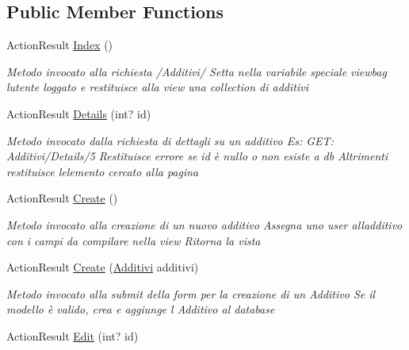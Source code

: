 \subsection*{Public Member Functions}
\begin{DoxyCompactItemize}
\item 
Action\+Result \mbox{\hyperlink{class_brew_day2_1_1_controllers_1_1_additivi_controller_abc59038a7b58a22f8300921d8c0fe72e}{Index}} ()
\begin{DoxyCompactList}\small\item\em Metodo invocato alla richiesta /\+Additivi/ Setta nella variabile speciale viewbag l\textquotesingle{}utente loggato e restituisce alla view una collection di additivi \end{DoxyCompactList}\item 
Action\+Result \mbox{\hyperlink{class_brew_day2_1_1_controllers_1_1_additivi_controller_a9fb0eab448c2b1bd33b3fdb2cd36ad55}{Details}} (int? id)
\begin{DoxyCompactList}\small\item\em Metodo invocato dalla richiesta di dettagli su un additivo Es\+: G\+ET\+: Additivi/\+Details/5 Restituisce errore se id è nullo o non esiste a db Altrimenti restituisce l\textquotesingle{}elemento cercato alla pagina \end{DoxyCompactList}\item 
Action\+Result \mbox{\hyperlink{class_brew_day2_1_1_controllers_1_1_additivi_controller_abe67a6f7b711dac3af4d6e1225867eb5}{Create}} ()
\begin{DoxyCompactList}\small\item\em Metodo invocato alla creazione di un nuovo additivo Assegna uno user all\textquotesingle{}additivo con i campi da compilare nella view Ritorna la vista \end{DoxyCompactList}\item 
Action\+Result \mbox{\hyperlink{class_brew_day2_1_1_controllers_1_1_additivi_controller_ac5f7c34cd02cfdb70cf7e832c08fa65a}{Create}} (\mbox{\hyperlink{class_brew_day2_1_1_models_1_1_additivi}{Additivi}} additivi)
\begin{DoxyCompactList}\small\item\em Metodo invocato alla submit della form per la creazione di un Additivo Se il modello è valido, crea e aggiunge l\textquotesingle{} Additivo al database \end{DoxyCompactList}\item 
Action\+Result \mbox{\hyperlink{class_brew_day2_1_1_controllers_1_1_additivi_controller_a1fd9cac1bf54e85865017590a6e8581f}{Edit}} (int? id)

\end{DoxyCompactItemize}
